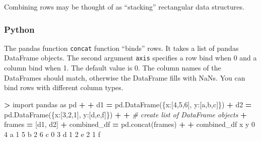 \documentclass[
]{book}
\newenvironment{Shaded}{\begin{snugshade}}{\end{snugshade}}
\newcommand{\CommentTok}[1]{\textcolor[rgb]{0.56,0.35,0.01}{\textit{#1}}}
\newcommand{\DecValTok}[1]{\textcolor[rgb]{0.00,0.00,0.81}{#1}}
\newcommand{\ImportTok}[1]{#1}
\newcommand{\NormalTok}[1]{#1}
\newcommand{\OperatorTok}[1]{\textcolor[rgb]{0.81,0.36,0.00}{\textbf{#1}}}
\newcommand{\StringTok}[1]{\textcolor[rgb]{0.31,0.60,0.02}{#1}}
\begin{document}
Combining rows may be thought of as ``stacking'' rectangular data structures.

\hypertarget{python-30}{%
\subsubsection*{Python}\label{python-30}}

The pandas function \texttt{concat} function ``binds'' rows. It takes a list of pandas DataFrame objects. The second argument \texttt{axis} specifies a row bind when 0 and a column bind when 1. The default value is 0. The column names of the DataFrames should match, otherwise the DataFrame fills with NaNs. You can bind rows with different column types.

\begin{Shaded}
\begin{Highlighting}[]
\OperatorTok{\textgreater{}} \ImportTok{import}\NormalTok{ pandas }\ImportTok{as}\NormalTok{ pd}
\OperatorTok{+} 
\OperatorTok{+}\NormalTok{ d1 }\OperatorTok{=}\NormalTok{ pd.DataFrame(\{}\StringTok{\textquotesingle{}x\textquotesingle{}}\NormalTok{:[}\DecValTok{4}\NormalTok{,}\DecValTok{5}\NormalTok{,}\DecValTok{6}\NormalTok{], }\StringTok{\textquotesingle{}y\textquotesingle{}}\NormalTok{:[}\StringTok{\textquotesingle{}a\textquotesingle{}}\NormalTok{,}\StringTok{\textquotesingle{}b\textquotesingle{}}\NormalTok{,}\StringTok{\textquotesingle{}c\textquotesingle{}}\NormalTok{]\})}
\OperatorTok{+}\NormalTok{ d2 }\OperatorTok{=}\NormalTok{ pd.DataFrame(\{}\StringTok{\textquotesingle{}x\textquotesingle{}}\NormalTok{:[}\DecValTok{3}\NormalTok{,}\DecValTok{2}\NormalTok{,}\DecValTok{1}\NormalTok{], }\StringTok{\textquotesingle{}y\textquotesingle{}}\NormalTok{:[}\StringTok{\textquotesingle{}d\textquotesingle{}}\NormalTok{,}\StringTok{\textquotesingle{}e\textquotesingle{}}\NormalTok{,}\StringTok{\textquotesingle{}f\textquotesingle{}}\NormalTok{]\})}
\OperatorTok{+} 
\OperatorTok{+} \CommentTok{\# create list of DataFrame objects}
\OperatorTok{+}\NormalTok{ frames }\OperatorTok{=}\NormalTok{ [d1, d2]}
\OperatorTok{+}\NormalTok{ combined\_df }\OperatorTok{=}\NormalTok{ pd.concat(frames)}
\OperatorTok{+} 
\OperatorTok{+}\NormalTok{ combined\_df}
\NormalTok{   x  y}
\DecValTok{0}  \DecValTok{4}\NormalTok{  a}
\DecValTok{1}  \DecValTok{5}\NormalTok{  b}
\DecValTok{2}  \DecValTok{6}\NormalTok{  c}
\DecValTok{0}  \DecValTok{3}\NormalTok{  d}
\DecValTok{1}  \DecValTok{2}\NormalTok{  e}
\DecValTok{2}  \DecValTok{1}\NormalTok{  f}
\end{Highlighting}
\end{Shaded}
\end{document}
